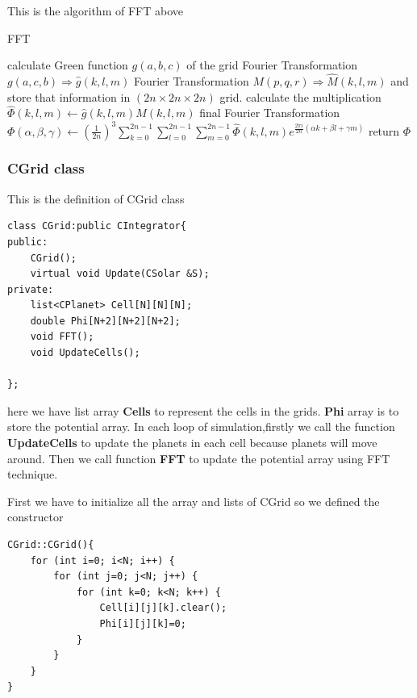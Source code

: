 \documentclass[12pt]{article}
\begin{document}
This is the algorithm of FFT above
\begin{algorithm}[h]
\caption{FFT}
calculate Green function $g(a,b,c)$ of the grid\;
Fourier Transformation $g(a,c,b) \Longrightarrow \hat{g}(k,l,m)$ \;
Fourier Transformation $M(p,q,r) \Longrightarrow \hat{M}(k,l,m)$ and store that information
in $(2n \times 2n \times 2n)$ grid.\;
calculate the multiplication $\hat{\Phi}(k,l,m) \leftarrow \hat{g}(k,l,m) \hat{M}(k,l,m)$\;
final Fourier Transformation $\Phi(\alpha , \beta , \gamma) \leftarrow (\frac{1}{2n})^3 \sum_{k=0}^{2n-1} \sum_{l=0}^{2n-1} \sum_{m=0}^{2n-1} \hat{\Phi}(k,l,m)e^{\frac{2 \pi i}{2n}(\alpha k + \beta l + \gamma m)}$\;
return $\Phi$\;
\end{algorithm}

\subsubsection{CGrid class}
This is the definition of CGrid class
\begin{lstlisting}[caption=CGrid class]
class CGrid:public CIntegrator{
public:
    CGrid();
    virtual void Update(CSolar &S);
private:
    list<CPlanet> Cell[N][N][N];
    double Phi[N+2][N+2][N+2];
    void FFT();
    void UpdateCells();
    
};
\end{lstlisting}
here we have list array \textbf{Cells} to represent the cells in the grids.
\textbf{Phi} array is to store the potential array.
In each loop of simulation,firstly we call the function \textbf{UpdateCells} to
update the planets in each cell because planets will move around.
Then we call function \textbf{FFT} to update the potential array using FFT technique.
 
First we have to initialize all the array and lists of CGrid so we defined the constructor
\begin{lstlisting}[caption=CGrid()]
CGrid::CGrid(){
    for (int i=0; i<N; i++) {
        for (int j=0; j<N; j++) {
            for (int k=0; k<N; k++) {
                Cell[i][j][k].clear();
                Phi[i][j][k]=0;
            }
        }
    }
}
\end{lstlisting}
\end{document}
